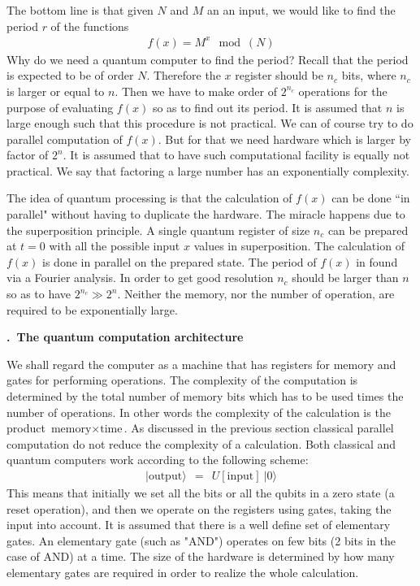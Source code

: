 \documentclass[onecolumn,fleqn, 11pt]{revtex4}
\newcommand{\beq}{\begin{eqnarray}}
\newcommand{\eeq}{\end{eqnarray}}
\renewcommand{\thesubsection}{\arabic{subsection}}
\renewcommand{\thesubsubsection}{\arabic{subsubsection}}
\newcommand{\sheadC}[1]
{
\addtocounter{subsubsection}{1}
\vspace{5mm}
{\bf \thesubsection.\thesubsubsection \ #1}  
\nopagebreak
\phantomsection
}
\begin{document}
The bottom line is that given $N$ and $M$ an an input,  
we would like to find the period $r$ of the functions 
\beq
f(x) = M^x \mod(N) 
\eeq
Why do we need a quantum computer to find the period?   
Recall that the period is expected to be of order $N$.
Therefore the $x$ register should be $n_c$ bits, 
where $n_c$ is larger or equal to $n$. 
Then we have to make order of $2^{n_c}$ operations 
for the purpose of evaluating $f(x)$ so as to find out 
its period. It is assumed that $n$ is large enough such that this 
procedure is not practical. We can of course try to do 
parallel computation of $f(x)$. But for that we need 
hardware which is larger by factor of $2^n$. It is assumed that 
to have such computational facility is equally not practical.
We say that factoring a large number has an exponentially complexity. 



The idea of quantum processing is that the calculation of $f(x)$ 
can be done ``in parallel" without having to duplicate 
the hardware. The miracle happens due to the superposition principle. 
A single quantum register of size $n_c$ can be prepared at $t=0$ with 
all the possible input $x$ values in superposition. 
The calculation of $f(x)$ is done in parallel on the 
prepared state. The period of $f(x)$ in found via a Fourier analysis. 
In order to get good resolution $n_c$ should be larger 
than $n$ so as to have $2^{n_c}\gg 2^n$. 
Neither the memory, nor the number of operation, 
are required to be exponentially large. 
         


\sheadC{The quantum computation architecture}

We shall regard the computer as a machine that has registers 
for memory and gates for performing operations. The complexity 
of the computation is determined by the total 
number of memory bits which has to be used times 
the number of operations. In other words the complexity 
of the calculation is the product ${ \mbox{memory}\times\mbox{time} }$. 
As discussed in the previous 
section classical parallel computation do not  
reduce the complexity of a calculation.  
Both classical and quantum computers 
work according to the following scheme:
\beq
|\mbox{output}\rangle \ \ = \ \ U[\mbox{input}] \ |0\rangle
\eeq
This means that initially we set all the bits or all the qubits 
in a zero state (a reset operation), and then we operate 
on the registers using gates, taking the input 
into account. It is assumed that there is a well define 
set of elementary gates. An elementary gate (such as "AND")  
operates on few bits (2 bits in the case of AND) 
at a time. The size of the hardware is determined by how 
many elementary gates are required in order to realize 
the whole calculation.
\end{document}
